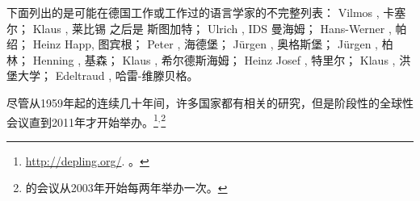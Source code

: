 下面列出的是可能在德国工作或工作过的语言学家的不完整列表：
Vilmos \citet{Agel2000a-u}, 卡塞尔；
Klaus \citet{Baumgaertner65a-u,Baumgaertner70a}, 莱比锡 之后是 斯图加特；
Ulrich \citet{Engel77,Engel2014a}, IDS 曼海姆； 
Hans-Werner \citet{Eroms85a,Eroms87b-u,Eroms2000a}, 帕绍； 
Heinz Happ, 图宾根；
Peter \citet{Hellwig78a-u,Hellwig2003a}, 海德堡；
Jürgen \citet{Heringer96a-u}, 奥格斯堡； 
Jürgen \citet{Kunze68a-u,Kunze75a-u}, 柏林；
Henning \citet{Lobin93a-u}, 基森；
Klaus \citet{Schubert87a-u}, 希尔德斯海姆；
Heinz Josef \citet{Weber97a}, 特里尔；
Klaus \citet{Welke88a-u,Welke2011a-u}, 洪堡大学；
Edeltraud \citet{Werner93a-u}, 哈雷-维滕贝格。

尽管从1959年起的连续几十年间，许多国家都有相关的研究，但是阶段性的全球性会议直到2011年才开始举办。\footnote{
  \href{http://depling.org/}{http://depling.org/}. 。
}$^,$\footnote{
  \mtt 的会议从2003年开始每两年举办一次。
}


